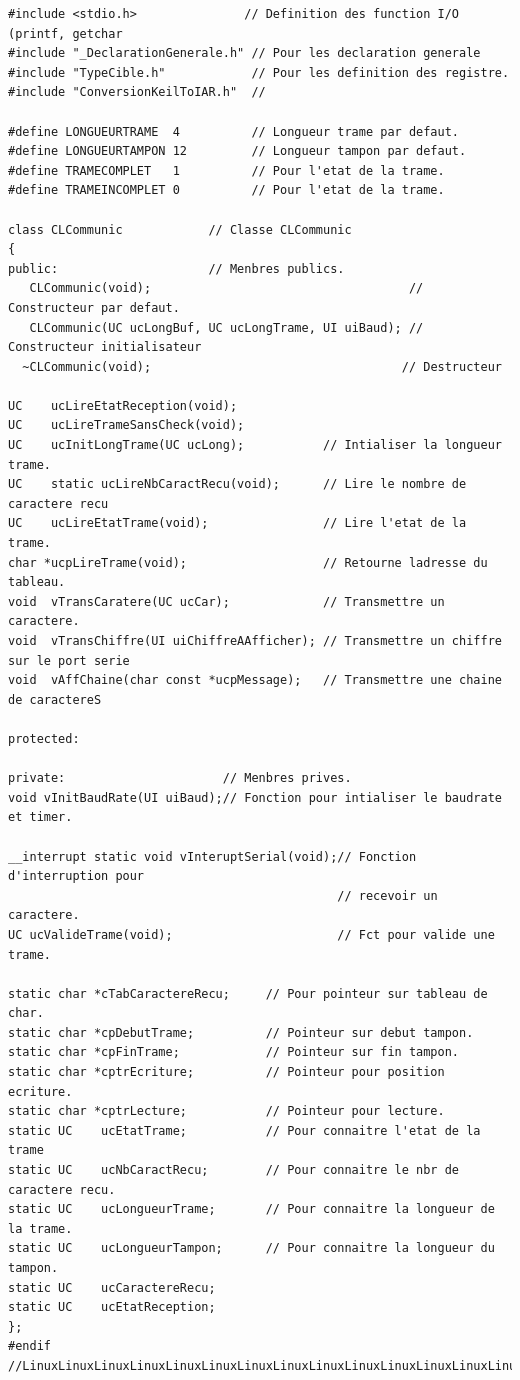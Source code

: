 \documentclass[10pt,a4paper,final]{article}
\begin{document}
\begin{lstlisting}[label={list:first},caption=Code source]
#include <stdio.h>               // Definition des function I/O (printf, getchar
#include "_DeclarationGenerale.h" // Pour les declaration generale
#include "TypeCible.h"            // Pour les definition des registre.
#include "ConversionKeilToIAR.h"  //

#define LONGUEURTRAME  4          // Longueur trame par defaut.
#define LONGUEURTAMPON 12         // Longueur tampon par defaut.
#define TRAMECOMPLET   1          // Pour l'etat de la trame.
#define TRAMEINCOMPLET 0          // Pour l'etat de la trame.

class CLCommunic            // Classe CLCommunic
{
public:                     // Menbres publics.
   CLCommunic(void);                                    // Constructeur par defaut.
   CLCommunic(UC ucLongBuf, UC ucLongTrame, UI uiBaud); // Constructeur initialisateur
  ~CLCommunic(void);                                   // Destructeur

UC    ucLireEtatReception(void);
UC    ucLireTrameSansCheck(void);
UC    ucInitLongTrame(UC ucLong);           // Intialiser la longueur trame.
UC    static ucLireNbCaractRecu(void);      // Lire le nombre de caractere recu
UC    ucLireEtatTrame(void);                // Lire l'etat de la trame.
char *ucpLireTrame(void);                   // Retourne ladresse du tableau.
void  vTransCaratere(UC ucCar);             // Transmettre un caractere.
void  vTransChiffre(UI uiChiffreAAfficher); // Transmettre un chiffre sur le port serie
void  vAffChaine(char const *ucpMessage);   // Transmettre une chaine de caractereS

protected:

private:                      // Menbres prives.
void vInitBaudRate(UI uiBaud);// Fonction pour intialiser le baudrate et timer.

__interrupt static void vInteruptSerial(void);// Fonction d'interruption pour
                                              // recevoir un caractere.
UC ucValideTrame(void);                       // Fct pour valide une trame.

static char *cTabCaractereRecu;     // Pour pointeur sur tableau de char.
static char *cpDebutTrame;          // Pointeur sur debut tampon.
static char *cpFinTrame;            // Pointeur sur fin tampon.
static char *cptrEcriture;          // Pointeur pour position ecriture.
static char *cptrLecture;           // Pointeur pour lecture.
static UC    ucEtatTrame;           // Pour connaitre l'etat de la trame
static UC    ucNbCaractRecu;        // Pour connaitre le nbr de caractere recu.
static UC    ucLongueurTrame;       // Pour connaitre la longueur de la trame.
static UC    ucLongueurTampon;      // Pour connaitre la longueur du tampon.
static UC    ucCaractereRecu;
static UC    ucEtatReception;
};
#endif
//LinuxLinuxLinuxLinuxLinuxLinuxLinuxLinuxLinuxLinuxLinuxLinuxLinuxLinuxLinuxTUX

















\end{lstlisting}
\end{document}
